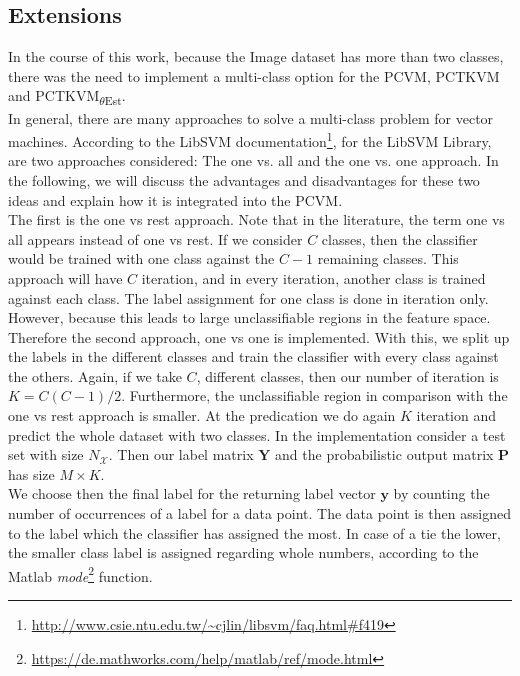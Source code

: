 \subsection{Extensions}\label{InSubSecExt}
In the course of this work, because the Image dataset has more than two classes, there was the need to implement a multi-class option for the \acs{PCVM}, \acs{PCTKVM} and \acs{PCTKVM}\textsubscript{$\theta$Est}.\\
In general, there are many approaches to solve a multi-class problem for vector machines.\cite[p. 113]{Abe.2010}
According to the LibSVM documentation\footnote{\url{http://www.csie.ntu.edu.tw/~cjlin/libsvm/faq.html\#f419}}, for the LibSVM Library, are two approaches considered: The one vs. all and the one vs. one approach.
In the following, we will discuss the advantages and disadvantages for these two ideas and explain how it is integrated into the \acs{PCVM}.\\
The first is the one vs rest approach.
Note that in the literature, the term one vs all appears instead of one vs rest.
If we consider $C$ classes, then the classifier would be trained with one class against the $C-1$ remaining classes.
This approach will have $C$ iteration, and in every iteration, another class is trained against each class.
The label assignment for one class is done in iteration only.
However, because this leads to large unclassifiable regions in the feature space.\cite[p. 114-116]{Abe.2010}\newline
Therefore the second approach, one vs one is implemented.
With this, we split up the labels in the different classes and train the classifier with every class against the others.
Again, if we take $C$, different classes, then our number of iteration is $K=C(C-1)/2$.
Furthermore, the unclassifiable region in comparison with the one vs rest approach is smaller.
At the predication we do again $K$ iteration and predict the whole dataset with two classes.\cite[p. 127-128]{Abe.2010}\newline
In the implementation consider a test set with size $N_\mathcal{X}$.
Then our label matrix $\mathbf{Y}$ and the probabilistic output matrix $\mathbf{P}$ has size $M\times K$.\\
We choose then the final label for the returning label vector $\mathbf{y}$ by counting the number of occurrences of a label for a data point.
The data point is then assigned to the label which the classifier has assigned the most.
In case of a tie the lower, the smaller class label is assigned regarding whole numbers, according to the Matlab \textit{mode}\footnote{\url{https://de.mathworks.com/help/matlab/ref/mode.html}} function.
